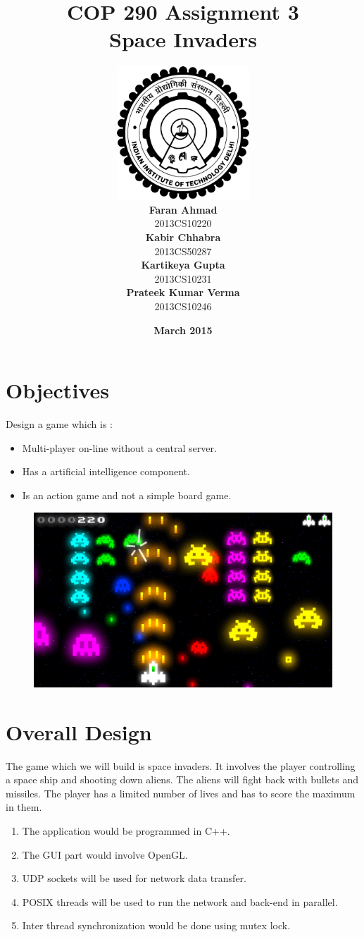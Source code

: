 \documentclass{article}
\title{\vspace*{\fill} \textbf{COP 290 Assignment 3}
	  \\ {\Large \textbf{Space Invaders}}
}
\author{
	\vspace{5mm} \includegraphics[width=5cm]{logo.png} \\
	 \textbf{Faran Ahmad}\\
	2013CS10220 \vspace{2mm} \\
	\textbf{Kabir Chhabra}\\ 
	2013CS50287 \vspace{2mm} \\
	\textbf{Kartikeya Gupta}\\ 
	2013CS10231 \vspace{2mm} \\
	\textbf{Prateek Kumar Verma}\\ 
	2013CS10246
}
\date{\vspace{3mm} \textbf{March 2015} \vspace*{\fill}}
\begin{document}
	\maketitle

	\newpage

	\tableofcontents

	\newpage

	\section{Objectives}
		Design a game which is :
		\begin{itemize}
			\item Multi-player on-line without a central server.
			\item Has a artificial intelligence component.
			\item Is an action game and not a simple board game.
		\end{itemize}
		\begin{figure}[ht!]
      	\centering
        	\includegraphics[width=1.0\linewidth]{gameplay.png}
    	\end{figure}
	\section{Overall Design}
		The game which we will build is space invaders. It involves the player controlling a space ship and shooting down aliens. The aliens will fight back with bullets and missiles. The player has a limited number of lives and has to score the maximum in them.
		\begin{enumerate}
			\item The application would be programmed in C++.
			\item The GUI part would involve OpenGL.
			\item UDP sockets will be used for network data transfer.
			\item POSIX threads will be used to run the network and back-end in parallel.
			\item Inter thread synchronization would be done using mutex lock.
		\end{enumerate}
\end{document}
